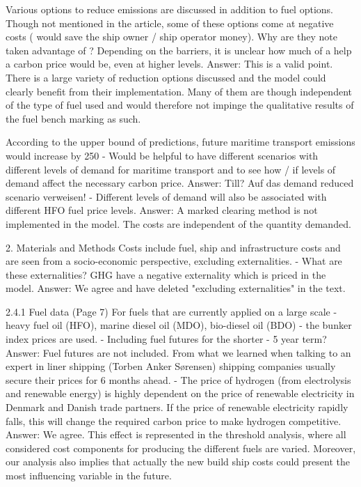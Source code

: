 Various options to reduce emissions are discussed in addition to fuel options. Though not mentioned in the article, some of these options come at negative costs ( would save the ship owner / ship operator money). Why are they note taken advantage of ? Depending on the barriers, it is unclear how much of a help a carbon price would be, even at higher levels.
Answer: This is a valid point. There is a large variety of reduction options discussed and the model could clearly benefit from their implementation. Many of them are though independent of the type of fuel used and would therefore not impinge the qualitative results of the fuel bench marking as such.
 
According to the upper bound of predictions, future maritime transport emissions would increase by 250%
-	Would be helpful to have different scenarios with different levels of demand for maritime transport and to see how / if levels of demand affect the necessary carbon price.
Answer: Till? Auf das demand reduced scenario verweisen!
-	Different levels of demand will also be associated with different HFO fuel price levels.
Answer: A marked clearing method is not implemented in the model. The costs are independent of the quantity demanded.

2. Materials and Methods
Costs include fuel, ship and infrastructure costs and are seen from a socio-economic perspective, excluding externalities. 
-       What are these externalities? GHG have a negative externality which is priced in the model.
Answer: We agree and have deleted "excluding externalities" in the text.

2.4.1 Fuel data (Page 7)
For fuels that are currently applied on a large scale - heavy fuel oil (HFO), marine diesel oil (MDO), bio-diesel oil (BDO) - the bunker index prices are used.
-	Including fuel futures for the shorter - 5 year term?
Answer: Fuel futures are not included. From what we learned when talking to an expert in liner shipping (Torben Anker Sørensen) shipping companies usually secure their prices for 6 months ahead.
-	The price of hydrogen (from electrolysis and renewable energy) is highly dependent on the price of renewable electricity in Denmark and Danish trade partners. If the price of renewable electricity rapidly falls, this will change the required carbon price to make hydrogen competitive.
Answer: We agree. This effect is represented in the threshold analysis, where all considered cost components for producing the different fuels are varied. Moreover, our analysis also implies that actually the new build ship costs could present the most influencing variable in the future.

